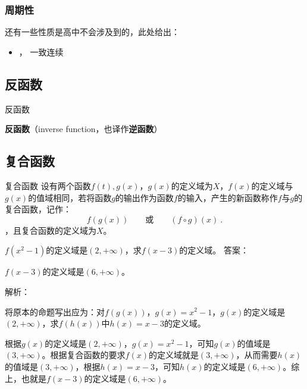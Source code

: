 \subsubsection{周期性}

还有一些性质是高中不会涉及到的，此处给出：
\begin{itemize}
\item {}， 一致连续
\end{itemize}

\subsection{反函数}

\begin{definition}{反函数}

\textbf{反函数}（inverse function，也译作\textbf{逆函数}）

\end{definition}

\subsection{复合函数}

\begin{definition}{复合函数}
设有两个函数$f(t),g(x)$，$g(x)$的定义域为$X$，$f(x)$的定义域与$g(x)$的值域相同，若将函数$g$的输出作为函数$f$的输入，产生的新函数称作$f$与$g$的复合函数，记作：
\begin{equation}
f(g(x))\qquad\text{或}\qquad(f \circ g)(x)~.
\end{equation}
，且复合函数的定义域为$X$。
\end{definition}

\begin{exercise}{$f(x^2-1)$的定义域是$(2,+\infty)$，求$f(x-3)$的定义域。}
答案：

$f(x-3)$的定义域是$(6,+\infty)$。

解析：

将原本的命题写出应为：对$f(g(x))$，$g(x)=x^2-1$，$g(x)$的定义域是$(2,+\infty)$，求$f(h(x))$中$h(x)=x-3$的定义域。

根据$g(x)$的定义域是$(2,+\infty)$，$g(x)=x^2-1$，可知$g(x)$的值域是$(3,+\infty)$。根据复合函数的要求$f(x)$的定义域就是$(3,+\infty)$，从而需要$h(x)$的值域是$(3,+\infty)$，根据$h(x)=x-3$，可知$h(x)$的定义域是$(6,+\infty)$。综上，也就是$f(x-3)$的定义域是$(6,+\infty)$。

\end{exercise}

